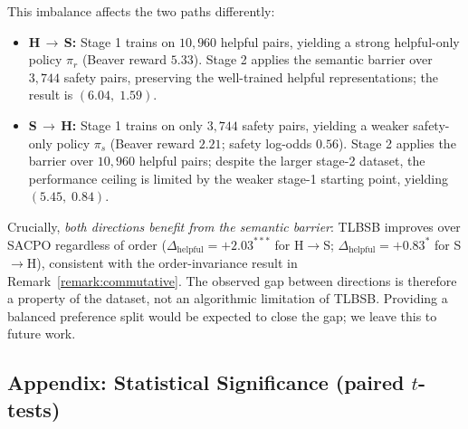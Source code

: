 This imbalance affects the two paths differently:
%
\begin{itemize}[leftmargin=1.8em, itemsep=2pt]
  \item \textbf{H$\,\to\,$S:} Stage 1 trains on $10{,}960$ helpful pairs,
        yielding a strong helpful-only policy $\pi_r$ (Beaver reward $5.33$).
        Stage 2 applies the semantic barrier over $3{,}744$ safety pairs,
        preserving the well-trained helpful representations; the result is
        $(6.04,\; 1.59)$.
  \item \textbf{S$\,\to\,$H:} Stage 1 trains on only $3{,}744$ safety pairs,
        yielding a weaker safety-only policy $\pi_s$
        (Beaver reward $2.21$; safety log-odds $0.56$).
        Stage 2 applies the barrier over $10{,}960$ helpful pairs;
        despite the larger stage-2 dataset, the performance ceiling is
        limited by the weaker stage-1 starting point, yielding
        $(5.45,\; 0.84)$.
\end{itemize}

Crucially, \emph{both directions benefit from the semantic barrier}:
TLBSB improves over SACPO regardless of order
($\Delta_{\mathrm{helpful}}=+2.03^{***}$ for H$\to$S;
$\Delta_{\mathrm{helpful}}=+0.83^{*}$ for S$\to$H),
consistent with the order-invariance result in Remark~\ref{remark:commutative}.
The observed gap between directions is therefore a property of the dataset,
not an algorithmic limitation of TLBSB.
Providing a balanced preference split would be expected to close the gap;
we leave this to future work.


\subsection*{Appendix: Statistical Significance (paired $t$-tests)}
\label{appendix:ttest}

